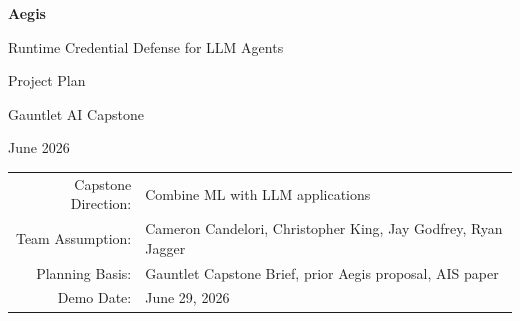 \documentclass[11pt,letterpaper]{article}
\begin{document}
\hypersetup{pageanchor=false}

\begin{titlepage}
    \centering
    \vspace*{1.25in}
    {\Huge\bfseries Aegis\par}
    \vspace{0.35in}
    {\Large Runtime Credential Defense for LLM Agents\par}
    \vspace{0.2in}
    {\large Project Plan\par}
    \vspace{0.6in}
    {\large Gauntlet AI Capstone\par}
    \vspace{0.15in}
    {\large June 2026\par}
    \vfill
    \begin{tabular}{rl}
        Capstone Direction: & Combine ML with LLM applications \\
        Team Assumption: & Cameron Candelori, Christopher King, Jay Godfrey, Ryan Jagger \\
        Planning Basis: & Gauntlet Capstone Brief, prior Aegis proposal, AIS paper \\
        Demo Date: & June 29, 2026 \\
    \end{tabular}
    \vfill
\end{titlepage}
\hypersetup{pageanchor=true}
\setcounter{page}{1}

\begin{abstract}
LLM agents are increasingly useful because they can act across external systems, but that usefulness requires access to credentials, tools, and untrusted content in the same operational loop. This creates a structural security risk: indirect prompt injection can steer an agent toward credential exfiltration through natural-language output, encoded transformations, low-rate multi-turn leakage, or structured tool-call arguments. Aegis is a proposed SDK-backed runtime security layer that can also run behind a lightweight gateway. It normalizes agent traffic, inspects requests, model output, and tool calls, scores exfiltration risk, and enforces configurable policy with auditable evidence. The project is grounded in the AIS research prototype, which combines activation-based credential access detection, calibrated honeytokens, and cumulative leakage accounting. Aegis adapts that research direction into a viable product architecture and focuses on a deployment gap identified by the research: structured tool-call arguments. The two-week implementation plan prioritizes a Python SDK with explicit guard methods, a FastAPI gateway wrapper, provider adapters, modular detectors, YAML policy modes, a local credential broker, canary detection, cumulative leakage scoring, Braintrust-backed evaluation with local JSONL fallback, and a small dashboard/reporting surface.
\end{abstract}
\end{document}
